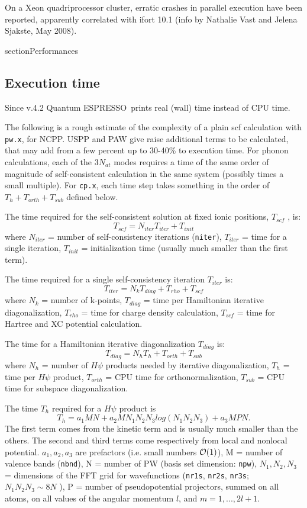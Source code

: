 \documentclass[12pt,a4paper]{article}
\def\qe{{\sc Quantum ESPRESSO}}
\def\pwx{\texttt{pw.x}}
\def\cpx{\texttt{cp.x}}
\begin{document}
On a Xeon quadriprocessor cluster, erratic crashes in parallel
execution have been reported, apparently correlated with ifort 10.1
(info by Nathalie Vast and Jelena Sjakste, May 2008).
\newpage

section{Performances}

\subsection{Execution time}

Since v.4.2 \qe\ prints real (wall) time instead of CPU time.

The following is a rough estimate of the complexity of a plain
scf calculation with \pwx, for NCPP. USPP and PAW 
give raise additional terms to be calculated, that may add from a 
few percent 
up to 30-40\% to execution time. For phonon calculations, each of the
$3N_{at}$ modes requires a time of the same order of magnitude of
self-consistent calculation in the same system (possibly times a small multiple). 
For \cpx, each time step takes something in the order of
$T_h + T_{orth} + T_{sub}$ defined below.

The time required for the self-consistent solution at fixed ionic
positions, $T_{scf}$ , is:
$$T_{scf} = N_{iter} T_{iter} + T_{init}$$
where $N_{iter}$  = number of self-consistency iterations (\texttt{niter}), 
$T_{iter}$ =
time for a single iteration, $T_{init}$ = initialization time
(usually much smaller than the first term).

The time required for a single self-consistency iteration $T_{iter}$ is:
$$T_{iter} = N_k T_{diag} +T_{rho} + T_{scf}$$
where $N_k$ = number of k-points, $T_{diag}$ = time per 
Hamiltonian iterative diagonalization, $T_{rho}$ = time for charge density 
calculation, $T_{scf}$ = time for Hartree and XC potential
calculation.
    
The time for a Hamiltonian iterative diagonalization $T_{diag}$ is:
$$T_{diag} = N_h T_h + T_{orth} + T_{sub}$$
where $N_h$ = number of $H\psi$ products needed by iterative diagonalization,
$T_h$ = time per $H\psi$ product, $T_{orth}$ = CPU time for 
orthonormalization, $T_{sub}$ = CPU time for subspace diagonalization.
    
The time $T_h$ required for a $H\psi$ product is
$$T_h = a_1 M N + a_2 M N_1 N_2 N_3 log(N_1 N_2 N_3 ) + a_3 M P N. $$
The first term comes from the kinetic term and is usually much smaller
than the others. The second and third terms come respectively from local
and nonlocal potential. $a_1, a_2, a_3$ are prefactors (i.e.
small numbers ${\cal O}(1)$), M = number of valence
bands (\texttt{nbnd}), N = number of PW (basis set dimension: \texttt{npw}), $N_1, N_2, N_3$ =
dimensions of the FFT grid for wavefunctions (\texttt{nr1s}, \texttt{nr2s},
\texttt{nr3s}; $N_1 N_2 N_3 \sim 8N$ ), 
P = number of pseudopotential projectors, summed on all atoms, on all values of the
angular momentum $l$, and $m = 1, . . . , 2l + 1$.
\end{document}
